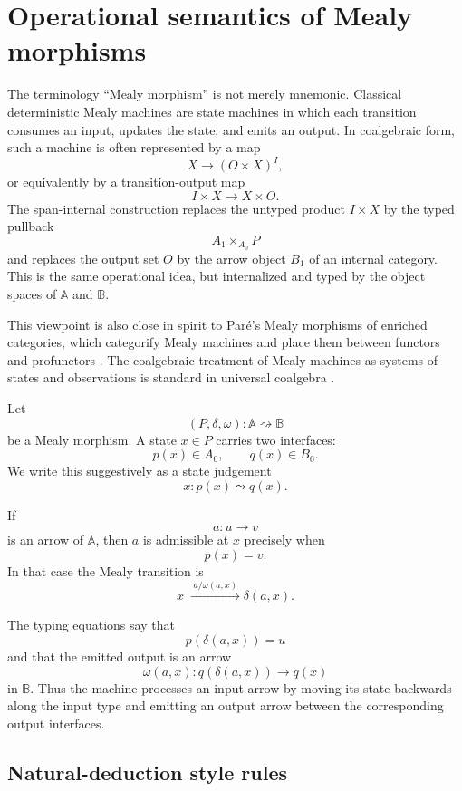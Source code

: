 \section{Operational semantics of Mealy morphisms}
\label{sec:operational-semantics-mealy}

The terminology ``Mealy morphism'' is not merely mnemonic. Classical deterministic Mealy machines are state machines in which each transition consumes an input, updates the state, and emits an output. In coalgebraic form, such a machine is often represented by a map
\[
X\to (O\times X)^I,
\]
or equivalently by a transition-output map
\[
I\times X\to X\times O.
\]
The span-internal construction replaces the untyped product \(I\times X\) by the typed pullback
\[
A_1\times_{A_0}P
\]
and replaces the output set \(O\) by the arrow object \(B_1\) of an internal category. This is the same operational idea, but internalized and typed by the object spaces of \(\mathbb A\) and \(\mathbb B\).

This viewpoint is also close in spirit to Paré's Mealy morphisms of enriched categories, which categorify Mealy machines and place them between functors and profunctors \cite{PareMealyMorphisms}. The coalgebraic treatment of Mealy machines as systems of states and observations is standard in universal coalgebra \cite{RuttenUniversalCoalgebra,BonsangueRuttenSilvaMealy}.

Let
\[
(P,\delta,\omega):\mathbb A\rightsquigarrow\mathbb B
\]
be a Mealy morphism. A state \(x\in P\) carries two interfaces:
\[
p(x)\in A_0,
\qquad
q(x)\in B_0.
\]
We write this suggestively as a state judgement
\[
x:p(x)\leadsto q(x).
\]

If
\[
a:u\to v
\]
is an arrow of \(\mathbb A\), then \(a\) is admissible at \(x\) precisely when
\[
p(x)=v.
\]
In that case the Mealy transition is
\[
x
\;\xrightarrow{\;a/\omega(a,x)\;}
\delta(a,x).
\]

The typing equations say that
\[
p(\delta(a,x))=u
\]
and that the emitted output is an arrow
\[
\omega(a,x):q(\delta(a,x))\to q(x)
\]
in \(\mathbb B\). Thus the machine processes an input arrow by moving its state backwards along the input type and emitting an output arrow between the corresponding output interfaces.

\subsection{Natural-deduction style rules}
\label{subsec:natural-deduction-mealy}


